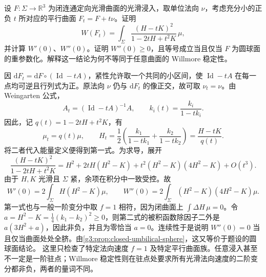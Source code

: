 \begin{optionalexercise}\label{g3:ex:willmore-parallel-surfaces}
	设 \(F:\Sigma\to\mathbb R^3\) 为闭连通定向光滑曲面的光滑浸入，取单位法向 \(\nu\)，考虑充分小的正负 \(t\) 所对应的平行曲面 \(F_t=F+t\nu\)。证明
	\[
		W(F_t)=\int_\Sigma\frac{(H-tK)^2}{1-2tH+t^2K}\,\mu,
	\]
	并计算 \(W'(0)\)、\(W''(0)\)。证明 \(W''(0)\ge0\)，且等号成立当且仅当 \(F\) 为圆球面的重参数化。解释这一结论为何不等同于任意曲面的 Willmore 稳定性。
\end{optionalexercise}
\begin{solution}
	因 \(\mathrm dF_t=\mathrm dF\circ(\operatorname{Id}-tA)\)，紧性允许取一个共同的小区间，使 \(\operatorname{Id}-tA\) 在每一点均可逆且行列式为正。原法向 \(\nu\) 仍与 \(\mathrm dF_t\) 的像正交，故可取 \(\nu_t=\nu\)。由 Weingarten 公式，
	\[
		A_t=(\operatorname{Id}-tA)^{-1}A,
		\qquad k_i(t)=\frac{k_i}{1-tk_i}.
	\]
	因此，记 \(q(t)=1-2tH+t^2K\)，有
	\[
		\mu_t=q(t)\mu,
		\qquad
		H_t=\frac12\left(\frac{k_1}{1-tk_1}+\frac{k_2}{1-tk_2}\right)
		=\frac{H-tK}{q(t)}.
	\]
	将二者代入能量定义便得到第一式。为求导，展开
	\[
		\frac{(H-tK)^2}{1-2tH+t^2K}
		=H^2+2tH(H^2-K)
		+t^2(H^2-K)(4H^2-K)+O(t^3).
	\]
	由于 \(H,K\) 光滑且 \(\Sigma\) 紧，余项在积分中一致受控。故
	\[
		W'(0)=2\int_\Sigma H(H^2-K)\mu,
		\qquad
		W''(0)=2\int_\Sigma(H^2-K)(4H^2-K)\mu.
	\]
	第一式也与一般一阶变分中取 \(f=1\) 相符，因为闭曲面上 \(\int\Delta H\,\mu=0\)。令 \(a=H^2-K=\tfrac14(k_1-k_2)^2\ge0\)，则第二式的被积函数除因子二外是 \(a(3H^2+a)\)，因此非负，并且为零恰当 \(a=0\)。连续性于是说明 \(W''(0)=0\) 当且仅当曲面处处全脐。由\cref{g3:prop:closed-umbilical-sphere}，这又等价于题设的圆球面结论。
	这里只检查了特定法向速度 \(f=1\) 及特定平行曲面族。任意浸入甚至不一定是一阶驻点；Willmore 稳定性则在驻点处要求所有光滑法向速度的二阶变分都非负，两者的量词不同。
\end{solution}
